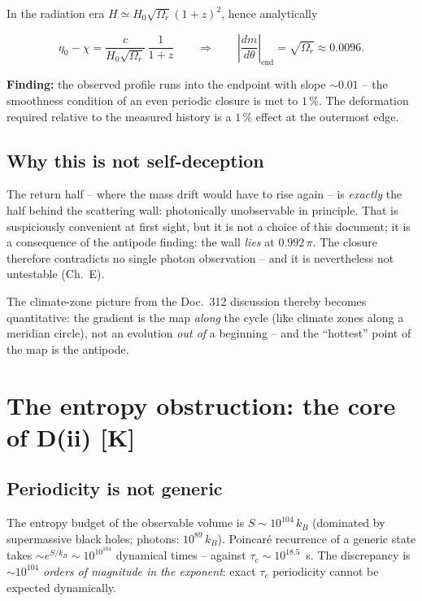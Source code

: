 In the radiation era $H \simeq H_0\sqrt{\Omega_r}(1{+}z)^2$, hence
analytically

\[
  \eta_0 - \chi = \frac{c}{H_0\sqrt{\Omega_r}}\,\frac{1}{1{+}z}
  \qquad\Longrightarrow\qquad
  \left|\frac{dm}{d\theta}\right|_{\text{end}}
  = \sqrt{\Omega_r} \approx 0.0096.
\]

\textbf{Finding:} the observed profile runs into the endpoint with
slope $\sim 0.01$ -- the smoothness condition of an even periodic
closure is met to $1\,\%$. The deformation required relative to
the measured history is a $1\,\%$ effect at the outermost edge.

\section{Why this is not self-deception}

The return half -- where the mass drift would have to rise again
-- is \emph{exactly} the half behind the scattering wall:
photonically unobservable in principle. That is suspiciously
convenient at first sight, but it is not a choice of this
document; it is a consequence of the antipode finding: the wall
\emph{lies} at $0.992\,\pi$. The closure therefore contradicts no
single photon observation -- and it is nevertheless not untestable
(Ch.~E).

The climate-zone picture from the Doc.~312 discussion thereby
becomes quantitative: the gradient is the map \emph{along} the
cycle (like climate zones along a meridian circle), not an
evolution \emph{out of} a beginning -- and the \enquote{hottest}
point of the map is the antipode.

\chapter{The entropy obstruction: the core of D(ii) [K]}

\section{Periodicity is not generic}

The entropy budget of the observable volume is
$S \sim 10^{104}\,k_B$ (dominated by supermassive black holes;
photons: $10^{89}\,k_B$). Poincaré recurrence of a generic state
takes $\sim e^{S/k_B} \sim 10^{10^{104}}$ dynamical times --
against $\tau_c \sim 10^{18.5}$~s. The discrepancy is
$\sim 10^{104}$ \emph{orders of magnitude in the exponent}: exact
$\tau_c$ periodicity cannot be expected dynamically.

